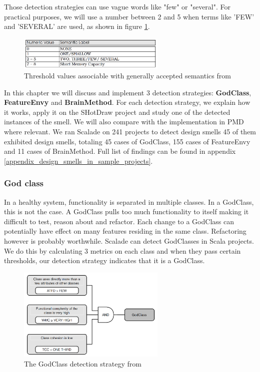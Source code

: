 \documentclass[onecolumn]{article}
\begin{document}
Those detection strategies can use vague words like "few" or "several". For practical purposes, we will use a number between 2 and 5 when terms like 'FEW' and 'SEVERAL' are used, as shown in figure \ref{fig:semantic_values}.

\begin{figure}[H]
    \centering
    \includegraphics[width=200pt]{fig/semantic_values.PNG}
    \caption{Threshold values associable with generally accepted semantics from \protect\cite{lanza2007object}}
    \label{fig:semantic_values}
\end{figure}

In this chapter we will discuss and implement 3 detection strategies: \textbf{GodClass}, \textbf{FeatureEnvy} and \textbf{BrainMethod}. For each detection strategy, we explain how it works, apply it on the SHotDraw project and study one of the detected instances of the smell. We will also compare with the implementation in PMD where relevant. We ran Scalade on 241 projects to detect design smells 45 of them exhibited design smells, totaling 45 cases of GodClass, 155 cases of FeatureEnvy and 11 cases of BrainMethod. Full list of findings can be found in appendix \ref{appendix_design_smells_in_sample_projects}. 


\subsubsection{God class}
In a healthy system, functionality is separated in multiple classes. In a GodClass, this is not the case. A GodClass pulls too much functionality to itself making it difficult to test, reason about and refactor. Each change to a GodClass can potentially have effect on many features residing in the same class. Refactoring however is probably worthwhile\cite{du2006does}.
Scalade can detect GodClasses in Scala projects. We do this by calculating 3 metrics on each class and when they pass certain thresholds, our detection strategy indicates that it is a GodClass.

\begin{figure}[H]
    \centering
    \includegraphics[width=200pt]{fig/lanza_GodClass.PNG}
    \caption{The GodClass detection strategy from \protect\cite{lanza2007object}}
    \label{fig:lanza_GodClass}
\end{figure}
\end{document}
